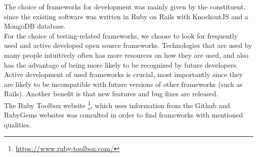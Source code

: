 
The choice of frameworks for development was mainly given by the
constituent, since the existing software was written in Ruby on Rails
with KnockoutJS and a MongoDB database.\\

For the choice of testing-related frameworks, we choose to look for
frequently used and active developed open source frameworks.
Technologies that are used by many people intuitively often has more
resources on how they are used, and also has the advantage of being more
likely to be recognized by future developers. Active development of used
frameworks is crucial, most importantly since they are likely to be
incompatible with future versions of other frameworks (such as Rails).
Another benefit is that new features and bug fixes are released.\\

The Ruby Toolbox website \footnote{\url{https://www.ruby-toolbox.com/}},
which uses information from the Github and RubyGems websites was
consulted in order to find frameworks with mentioned qualities.\\

